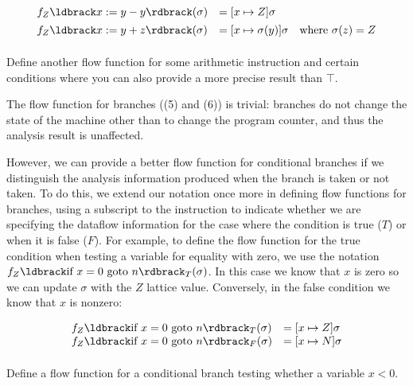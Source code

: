 \documentclass[11pt]{article}
\begin{document}
\[
\begin{array}{lll}

f_Z\parg{x := y - y}(\sigma) & = [x \mapsto Z]\sigma\\[1ex]
f_Z\parg{x := y + z}(\sigma) & = [x \mapsto \sigma(y)]\sigma & \mbox{where}~ \sigma(z)=Z\\[1ex]

\end{array}
\]

 Define another flow function for some arithmetic instruction and
certain conditions where you can also provide a more precise result than $\top$.


The flow function for branches ((5) and (6)) is trivial:  branches do not change the
state of the machine other than to change the program counter, and thus the analysis result is unaffected.

However, we can provide a better flow function for conditional branches if we
distinguish the analysis information produced when the branch is taken or not
taken.  To do this, we extend our notation once more in defining flow functions
for branches, using a subscript to the instruction to indicate whether we are
specifying the dataflow information for the case where the condition is true
($T$) or when it is false ($F$).  For example, to define the flow function for
the true condition when testing a variable for equality with zero, we use the
notation $f_Z\parg{\mbox{if}~x=0~\mbox{goto}~n}_T(\sigma)$.  In this case we
know that $x$ is zero so we can update $\sigma$ with the $Z$ lattice value.
Conversely, in the false condition we know that $x$ is nonzero:

\[
\begin{array}{lll}

f_Z\parg{\mbox{if}~x=0~\mbox{goto}~n}_T(\sigma) & = [x \mapsto Z]\sigma\\
f_Z\parg{\mbox{if}~x=0~\mbox{goto}~n}_F(\sigma) & = [x \mapsto N]\sigma\\[1ex]

\end{array}
\]

  Define a flow function for a conditional branch testing whether a variable $x < 0$.
\end{document}
